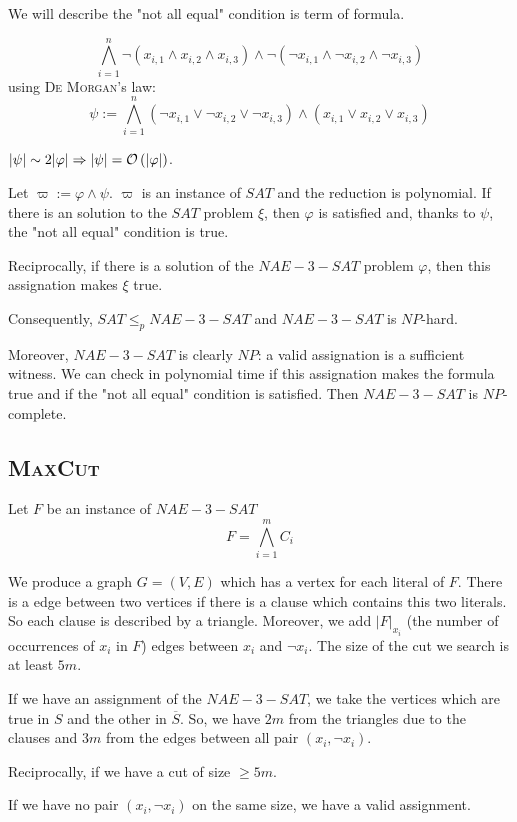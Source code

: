 We will describe the "not all equal" condition is term of formula.

$$
    \bigwedge\limits_{i=1}^n \neg(x_{i,1} \wedge x_{i,2} \wedge x_{i,3}) \wedge \neg(\neg x_{i,1} \wedge \neg x_{i,2} \wedge \neg x_{i,3})
$$
using \textsc{De Morgan}'s law:
$$
    \psi:=\bigwedge\limits_{i=1}^n (\neg x_{i,1} \vee \neg x_{i,2} \vee \neg x_{i,3}) \wedge (x_{i,1} \vee x_{i,2} \vee x_{i,3})
$$

$\vert \psi\vert \sim 2\vert \varphi \vert \Rightarrow \vert \psi \vert = \mathcal O \left( \vert\varphi\vert \right)$. 

Let $\varpi := \varphi \wedge \psi$. $\varpi$ is an instance of $SAT$ and the reduction is polynomial. If there is an solution to the $SAT$ problem $\xi$, then $\varphi$ is satisfied and, thanks to $\psi$, the "not all equal" condition is true.

Reciprocally, if there is a solution of the $NAE-3-SAT$ problem $\varphi$, then this assignation makes $\xi$ true.

Consequently, $SAT \leqslant_p NAE-3-SAT$ and $NAE-3-SAT$ is $NP$-hard. 

Moreover, $NAE-3-SAT$ is clearly $NP$: a valid assignation is a sufficient witness. We can check in polynomial time if this assignation makes the formula true and if the "not all equal" condition is satisfied. Then $NAE-3-SAT$ is $NP$-complete.

\subsection{\textsc{MaxCut}}

Let $F$ be an instance of $NAE-3-SAT$
$$
    F=\bigwedge\limits_{i=1}^m C_i
$$

We produce a graph $G=(V,E)$ which has a vertex for each literal of $F$. There is a edge between two vertices if there is a clause which contains this two literals. So each clause is described by a triangle. Moreover, we add $\vert F\vert_{x_i}$ (the number of occurrences of $x_i$ in $F$) edges between $x_i$ and $\neg x_i$. The size of the cut we search is at least $5m$.

If we have an assignment of the $NAE-3-SAT$, we take the vertices which are true in $S$ and the other in $\overline{S}$. So, we have $2m$ from the triangles due to the clauses and $3m$ from the edges between all pair $(x_i,\neg x_i)$.

Reciprocally, if we have a cut of size $\geqslant 5m$.

If we have no pair $(x_i, \neg x_i)$ on the same size, we have a valid assignment.

